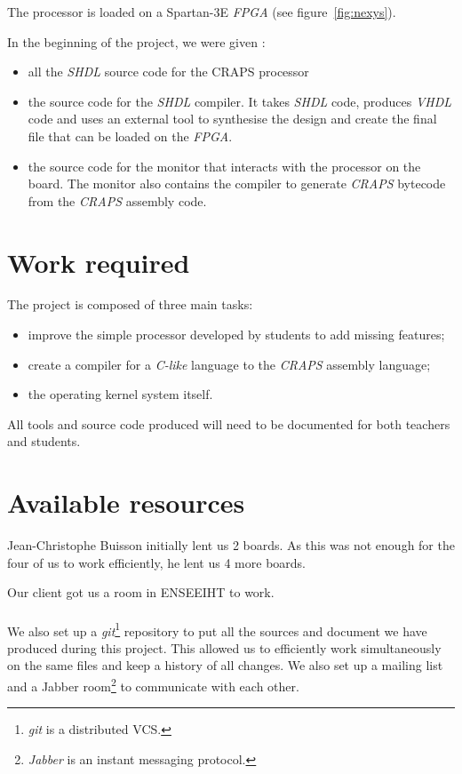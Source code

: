 \documentclass[openany, a4paper]{book}
\begin{document}
      The processor is loaded on a Spartan-3E \emph{FPGA} (see
      figure~\ref{fig:nexys}).

      In the beginning of the project, we were given :
      \begin{itemize}
        \item all the \emph{SHDL} source code for the CRAPS processor
        \item the source code for the \emph{SHDL} compiler. It takes \emph{SHDL}
          code, produces \emph{VHDL} code and uses an external tool to
          synthesise the design and create the final file that can be loaded on
          the \emph{FPGA}.
        \item the source code for the monitor that interacts with the processor
          on the board. The monitor also contains the compiler to generate
          \emph{CRAPS} bytecode from the \emph{CRAPS} assembly code.
      \end{itemize}

    \section{Work required}
      The project is composed of three main tasks:
      \begin{itemize}
        \item improve the simple processor developed by students to add missing
          features;
        \item create a compiler for a \textit{C-like} language to the
          \emph{CRAPS} assembly language;
        \item the operating kernel system itself.
      \end{itemize}

      All tools and source code produced will need to be documented for both
      teachers and students.

    \section{Available resources}
      Jean-Christophe Buisson initially lent us 2 boards. As this was not enough
      for the four of us to work efficiently, he lent us 4 more boards.

      Our client got us a room in ENSEEIHT to work.

      \paragraph{}
      We also set up a \textit{git}\footnote{\textit{git} is a distributed
      VCS.} repository to put all the sources and
      document we have produced during this project. This allowed us to
      efficiently work simultaneously on the same files and keep a history of
      all changes.  We also set up a mailing list and a Jabber
      room\footnote{\textit{Jabber} is an instant messaging protocol.} to
      communicate with each other.
\end{document}
